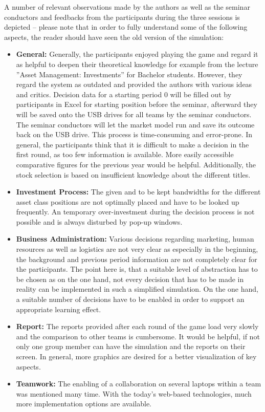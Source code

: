 A number of relevant observations made by the authors as well as the seminar conductors and feedbacks from the participants during the three sessions is depicted – please note that in order to fully understand some of the following aspects, the reader should have seen the old version of the simulation:
\begin{itemize}
  \item \textbf{General:} Generally, the participants enjoyed playing the game and regard it as helpful to deepen their theoretical knowledge for example from the lecture ''Asset Management: Investments'' for Bachelor students. However, they regard the system as outdated and provided the authors with various ideas and critics. Decision data for a starting period 0 will be filled out by participants in Excel for starting position before the seminar, afterward they will be saved onto the USB drives for all teams by the seminar conductors. The seminar conductors will let the market model run and save its outcome back on the USB drive. This process is time-consuming and error-prone. In general, the participants think that it is difficult to make a decision in the first round, as too few information is available. More easily accessible comparative figures for the previous year would be helpful. Additionally, the stock selection is based on insufficient knowledge about the different titles.
  \item \textbf{Investment Process:} The given and to be kept bandwidths for the different asset class positions are not optimally placed and have to be looked up frequently. An temporary over-investment during the decision process is not possible and is always disturbed by pop-up windows.
  \item \textbf{Business Administration:} Various decisions regarding marketing, human resources as well as logistics are not very clear as especially in the beginning, the background and previous period information are not completely clear for the participants. The point here is, that a suitable level of abstraction has to be chosen as on the one hand, not every decision that has to be made in reality can be implemented in such a simplified simulation. On the one hand, a suitable number of decisions have to be enabled in order to support an appropriate learning effect.
  \item \textbf{Report:} The reports provided after each round of the game load very slowly and the comparison to other teams is cumbersome. It would be helpful, if not only one group member can have the simulation and the reports on their screen. In general, more graphics are desired for a better visualization of key aspects.
  \item \textbf{Teamwork:} The enabling of a collaboration on several laptops within a team was mentioned many time. With the today’s web-based technologies, much more implementation options are available.
\end{itemize}

